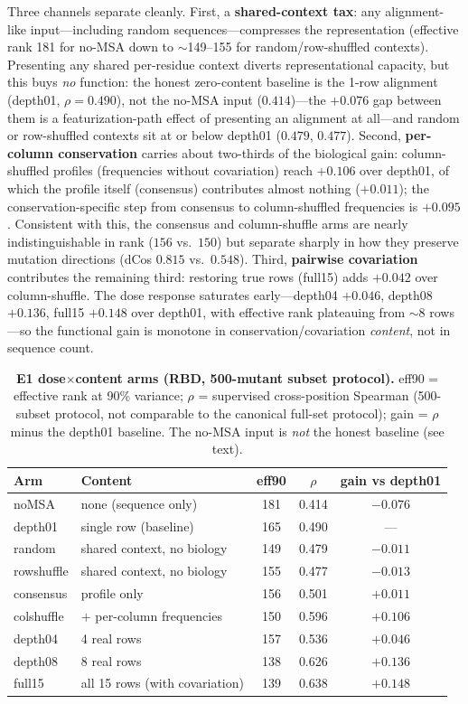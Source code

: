 \documentclass[11pt]{article}
\newcommand{\eff}{eff90}
\begin{document}
Three channels separate cleanly. First, a \textbf{shared-context tax}: any
alignment-like input---including random sequences---compresses the
representation (effective rank 181 for no-MSA down to $\sim$149--155 for
random/row-shuffled contexts). Presenting any shared per-residue context
diverts representational capacity, but this buys \emph{no} function: the
honest zero-content baseline is the 1-row alignment (depth01, $\rho=0.490$),
not the no-MSA input ($0.414$)---the $+0.076$ gap between them is a
featurization-path effect of presenting an alignment at all---and random or
row-shuffled contexts sit at or below depth01 ($0.479$, $0.477$). Second,
\textbf{per-column conservation} carries about two-thirds of the biological
gain: column-shuffled profiles (frequencies without covariation) reach
$+0.106$ over depth01, of which the profile itself (consensus) contributes
almost nothing ($+0.011$); the conservation-specific step from consensus to
column-shuffled frequencies is $+0.095$. Consistent with this, the consensus
and column-shuffle arms are nearly indistinguishable in rank ($156$ vs.\
$150$) but separate sharply in how they preserve mutation directions (dCos
$0.815$ vs.\ $0.548$). Third, \textbf{pairwise covariation} contributes the
remaining third: restoring true rows (full15) adds $+0.042$ over
column-shuffle. The dose response saturates early---depth04 $+0.046$, depth08
$+0.136$, full15 $+0.148$ over depth01, with effective rank plateauing from
$\sim$8 rows---so the functional gain is monotone in conservation/covariation
\emph{content}, not in sequence count.

\begin{table}[t]
\centering
\caption{\textbf{E1 dose$\times$content arms (RBD, 500-mutant subset
protocol).} \eff{} = effective rank at 90\% variance; $\rho$ = supervised
cross-position Spearman (500-subset protocol, not comparable to the canonical
full-set protocol); gain = $\rho$ minus the depth01 baseline. The no-MSA
input is \emph{not} the honest baseline (see text).}
\label{tab:e1}
\small
\begin{tabular}{llccc}
\toprule
Arm & Content & \eff{} & $\rho$ & gain vs depth01 \\
\midrule
noMSA      & none (sequence only)          & 181 & 0.414 & $-0.076$ \\
depth01    & single row (baseline)         & 165 & 0.490 & --- \\
random     & shared context, no biology    & 149 & 0.479 & $-0.011$ \\
rowshuffle & shared context, no biology    & 155 & 0.477 & $-0.013$ \\
consensus  & profile only                  & 156 & 0.501 & $+0.011$ \\
colshuffle & $+$ per-column frequencies    & 150 & 0.596 & $+0.106$ \\
depth04    & 4 real rows                   & 157 & 0.536 & $+0.046$ \\
depth08    & 8 real rows                   & 138 & 0.626 & $+0.136$ \\
full15     & all 15 rows (with covariation)& 139 & 0.638 & $+0.148$ \\
\bottomrule
\end{tabular}
\end{table}
\end{document}
